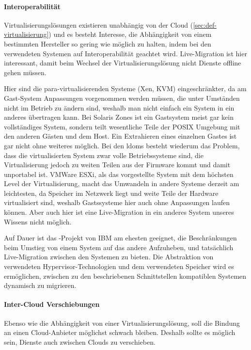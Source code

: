 \paragraph*{Interoperabilität}
Virtualisierungslösungen existieren unabhängig von der Cloud
(\autoref{sec:def-virtualisierung}) und es besteht Interesse, die
Abhängigkeit von einem bestimmten Hersteller so gering wie möglich zu
halten, indem bei den verwendeten Systemen auf Interoperabilität
geachtet wird. Live-Migration ist hier interessant, damit beim Wechsel
der Virtualisierungslösung nicht Dienste offline gehen müssen.

Hier sind die para-virtualisierenden Systeme (Xen, \ac{KVM})
eingeschränkter, da am Gast-System Anpassungen vorgenommen werden
müssen, die unter Umständen nicht im Betrieb zu ändern sind, weshalb man nicht
einfach ein System in ein anderes übertragen kann. Bei Solaris Zones
ist ein Gastsystem meist gar kein vollständiges System, sondern teilt
wesentliche Teile der POSIX Umgebung mit den anderen Gästen und dem
Host. Ein Extrahieren eines einzelnen Gastes ist gar nicht ohne
weiteres möglich. Bei den \acp{ldom} besteht wiederum das Problem,
dass die virtualisierten System zwar volle Betriebssysteme sind, die
Virtualisierung jedoch zu weiten Teilen aus der Firmware kommt und
damit unportabel ist. VMWare ESXi, als das vorgestellte System mit dem
höchsten Level der Virtualisierung, macht das Umwandeln in andere
Systeme derzeit am leichtesten, da Speicher im Netzwerk liegt und
weite Teile der Hardware virtualisiert sind, weshalb Gastssysteme hier
auch ohne Anpassungen laufen können. Aber auch hier ist eine
Live-Migration in ein anderes System unseres Wissens nicht möglich.

Auf Dauer ist das \reservoir-Projekt von IBM am ehesten geeignet, die
Beschränkungen beim Umstieg von einem System auf das andere
Aufzuheben, und tatsächlich Live-Migration zwischen den Systemen zu
bieten. Die Abstraktion von verwendeten Hypervisor-Technologien und
dem verwendeten Speicher wird es ermöglichen, zwischen zu den
beschriebenen Schnittstellen kompatiblen Systemen dynamisch zu
migrieren.

\paragraph*{Inter-Cloud Verschiebungen}
Ebenso wie die Abhängigkeit von einer Virtualisierungslösung, soll die
Bindung an einen Cloud-Anbieter möglichst schwach bleiben. Deshalb
sollte es möglich sein, Dienste auch zwischen Clouds zu verschieben.

